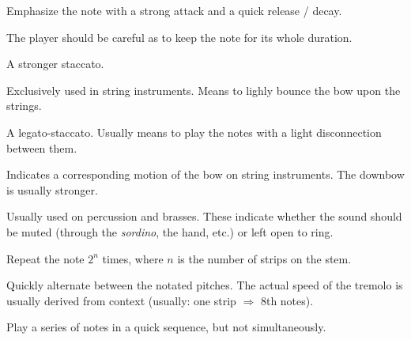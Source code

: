 \begin{definition}[Marcato]
    Emphasize the note with a strong attack and a quick release / decay.
\end{definition}

\begin{definition}[Tenuto]
    The player should be careful as to keep the note for its whole duration.
\end{definition}

\begin{definition}[Staccatissimo]
    A stronger staccato.
\end{definition}

\begin{definition}[Spiccato]
    Exclusively used in string instruments. Means to lighly bounce the bow upon the strings.
\end{definition}

\begin{definition}[Portato]
    A legato-staccato. Usually means to play the notes with a light disconnection between them.
\end{definition}

\begin{definition}
    Indicates a corresponding motion of the bow on string instruments. The downbow is usually stronger.
\end{definition}

\begin{definition}
    Usually used on percussion and brasses. These indicate whether the sound should be muted (through the \emph{sordino}, the hand, etc.) or left open to ring.
\end{definition}

\begin{definition}
    Repeat the note $2^n$ times, where $n$ is the number of strips on the stem.
\end{definition}

\begin{definition}
    Quickly alternate between the notated pitches. The actual speed of the tremolo is usually derived from context (usually: one strip $\Rightarrow$ 8th notes).
\end{definition}

\begin{definition}[Arpeggio]
    Play a series of notes in a quick sequence, but not simultaneously.
\end{definition}

